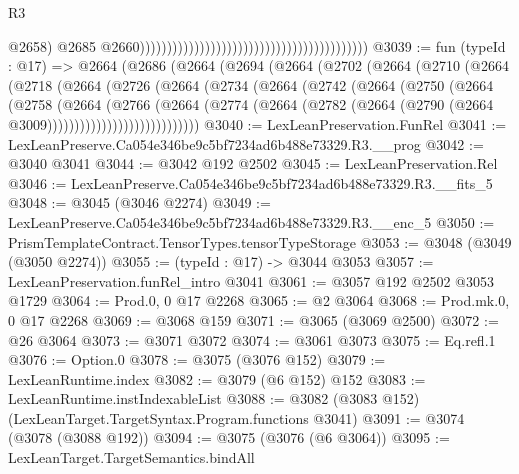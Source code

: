 \begin{lexlean}{R3}
\begin{coremodule}
                                                                                          @2658)
                                                                                        @2685
                                                                                        @2660))))))))))))))))))))))))))))))))))))))))))
@3039 := fun (typeId : @17) =>
  @2664
    (@2686
      (@2664
        (@2694
          (@2664
            (@2702
              (@2664
                (@2710
                  (@2664
                    (@2718
                      (@2664
                        (@2726
                          (@2664
                            (@2734
                              (@2664
                                (@2742
                                  (@2664
                                    (@2750
                                      (@2664
                                        (@2758
                                          (@2664
                                            (@2766
                                              (@2664
                                                (@2774
                                                  (@2664
                                                    (@2782
                                                      (@2664
                                                        (@2790
                                                          (@2664 @3009))))))))))))))))))))))))))))
@3040 := LexLeanPreservation.FunRel
@3041 := LexLeanPreserve.Ca054e346be9c5bf7234ad6b488e73329.R3.__prog
@3042 := @3040 @3041
@3044 := @3042 @192 @2502
@3045 := LexLeanPreservation.Rel
@3046 := LexLeanPreserve.Ca054e346be9c5bf7234ad6b488e73329.R3.__fits_5
@3048 := @3045 (@3046 @2274)
@3049 := LexLeanPreserve.Ca054e346be9c5bf7234ad6b488e73329.R3.__enc_5
@3050 := PrismTemplateContract.TensorTypes.tensorTypeStorage
@3053 := @3048 (@3049 (@3050 @2274))
@3055 := (typeId : @17) -> @3044 @3053
@3057 := LexLeanPreservation.funRel_intro @3041
@3061 := @3057 @192 @2502 @3053 @1729
@3064 := Prod.{0, 0} @17 @2268
@3065 := @2 @3064
@3068 := Prod.mk.{0, 0} @17 @2268
@3069 := @3068 @159
@3071 := @3065 (@3069 @2500)
@3072 := @26 @3064
@3073 := @3071 @3072
@3074 := @3061 @3073
@3075 := Eq.refl.{1}
@3076 := Option.{0}
@3078 := @3075 (@3076 @152)
@3079 := LexLeanRuntime.index
@3082 := @3079 (@6 @152) @152
@3083 := LexLeanRuntime.instIndexableList
@3088 := @3082 (@3083 @152) (LexLeanTarget.TargetSyntax.Program.functions @3041)
@3091 := @3074 (@3078 (@3088 @192))
@3094 := @3075 (@3076 (@6 @3064))
@3095 := LexLeanTarget.TargetSemantics.bindAll

\end{coremodule}
\end{lexlean}
